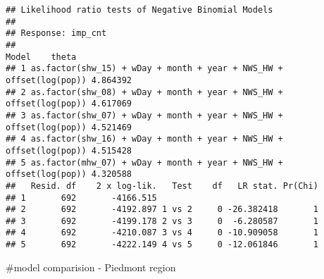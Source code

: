 \documentclass[
]{article}
\begin{document}
\begin{verbatim}
## Likelihood ratio tests of Negative Binomial Models
## 
## Response: imp_cnt
##                                                                 Model    theta
## 1 as.factor(shw_15) + wDay + month + year + NWS_HW + offset(log(pop)) 4.864392
## 2 as.factor(shw_08) + wDay + month + year + NWS_HW + offset(log(pop)) 4.617069
## 3 as.factor(shw_07) + wDay + month + year + NWS_HW + offset(log(pop)) 4.521469
## 4 as.factor(shw_16) + wDay + month + year + NWS_HW + offset(log(pop)) 4.515428
## 5 as.factor(mhw_07) + wDay + month + year + NWS_HW + offset(log(pop)) 4.320588
##   Resid. df    2 x log-lik.   Test    df   LR stat. Pr(Chi)
## 1       692       -4166.515                                
## 2       692       -4192.897 1 vs 2     0 -26.382418       1
## 3       692       -4199.178 2 vs 3     0  -6.280587       1
## 4       692       -4210.087 3 vs 4     0 -10.909058       1
## 5       692       -4222.149 4 vs 5     0 -12.061846       1
\end{verbatim}

\#model comparision - Piedmont region
\end{document}
